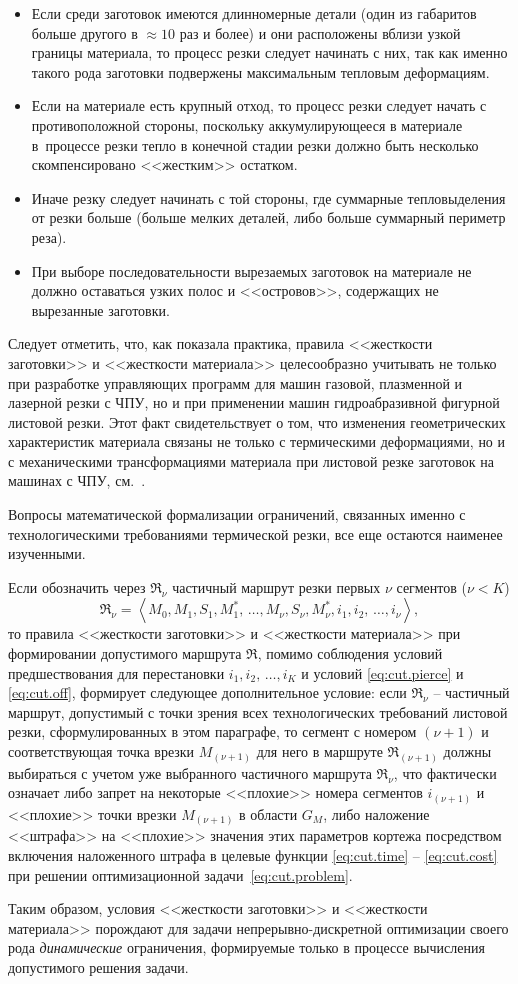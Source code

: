\begin{itemize}
  \item
  Если
  среди заготовок имеются длинномерные детали
  (один из габаритов больше другого в $\approx 10$ раз и более)
  и они расположены вблизи
  узкой границы материала,
  то процесс резки следует начинать с них,
  так как именно такого рода заготовки
  подвержены максимальным тепловым деформациям.
  \item
  Если на материале есть крупный отход,
  то
  процесс резки следует начать с противоположной стороны,
  поскольку аккумулирующееся в материале в~процессе резки
  тепло в конечной стадии резки должно быть
  несколько скомпенсировано <<жестким>> остатком.
  \item
  Иначе
  резку следует начинать с той стороны,
  где суммарные тепловыделения от резки больше
  (больше мелких деталей, либо больше суммарный периметр реза).
  \item
  При выборе последовательности вырезаемых заготовок
  на материале не должно оставаться узких полос и <<островов>>,
  содержащих не вырезанные заготовки.
\end{itemize}

Следует отметить, что, как показала практика,
правила <<жесткости заготовки>> и <<жесткости материала>>
целесообразно учитывать
не только при разработке управляющих программ для машин газовой,
плазменной и лазерной резки с ЧПУ,
но и при применении машин гидроабразивной фигурной листовой резки.
Этот факт свидетельствует о том,
что изменения геометрических характеристик материала
связаны не только с термическими деформациями,
но и с механическими трансформациями материала
при листовой резке заготовок на машинах с ЧПУ,
см.~\cite{bi:book2020}.

Вопросы математической формализации ограничений,
связанных именно с технологическими требованиями термической резки,
все еще остаются наименее изученными.

Если обозначить через
$\mathfrak R_\nu$
частичный маршрут резки первых $\nu$
сегментов
($\nu < K$)
$$
  \mathfrak R_\nu = \left<
    M_0, M_1, S_1, M_1^*, \,\dots, M_\nu, S_\nu, M_\nu^*,
    i_1, i_2, \,\dots, i_\nu
  \right>
  ,
$$
то правила <<жесткости заготовки>> и <<жесткости материала>>
при формировании допустимого маршрута
$\mathfrak R$,
помимо соблюдения условий предшествования для перестановки
$i_1, i_2, \,\dots, i_K$
и условий \eqref{eq:cut.pierce} и \eqref{eq:cut.off},
формирует следующее дополнительное условие:
если
$\mathfrak R_\nu$ -- частичный маршрут,
допустимый с точки зрения всех технологических
требований листовой резки,
сформулированных в этом параграфе,
то сегмент с номером $(\nu+1)$
и соответствующая точка врезки $M_{(\nu+1)}$
для него в маршруте
$\mathfrak R_{(\nu+1)}$
должны выбираться с учетом уже выбранного частичного маршрута
$\mathfrak R_\nu$,
что фактически означает либо запрет
на некоторые <<плохие>> номера сегментов
$i_{(\nu+1)}$
и <<плохие>> точки врезки
$M_{(\nu+1)}$
в области  $G_M$,
либо наложение <<штрафа>> на <<плохие>> значения
этих параметров кортежа
посредством включения наложенного штрафа в целевые функции
\eqref{eq:cut.time} -- \eqref{eq:cut.cost}
при решении оптимизационной задачи~\eqref{eq:cut.problem}.

Таким образом,
условия <<жесткости заготовки>> и <<жесткости материала>>
порождают для задачи непрерывно-дискретной оптимизации
своего рода \textit{динамические} ограничения,
формируемые только в процессе вычисления допустимого решения задачи.
